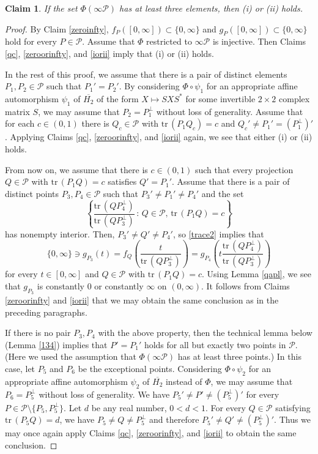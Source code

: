 \documentclass[10pt]{amsart}
\newtheorem{claim}[theorem]{Claim}
\theoremstyle{definition}
\theoremstyle{remark}
\numberwithin{subsection}{section}
\numberwithin{equation}{section}
\newcommand\cP{{\mathcal{P}}}
\newcommand\oH{{\overline{H_2}}}
\begin{document}
\begin{claim}
If the set $\Phi(\infty \cP)$ has at least three elements, then (i) or (ii) holds.
\end{claim}
\begin{proof}
By Claim \ref{zeroinfty}, $f_{P}([0, \infty])\subset \{0, \infty\}$ and $g_{P}([0, \infty])\subset \{0, \infty\}$ hold for every $P\in \cP$.
Assume that $\Phi$ restricted to $\infty \cP$ is injective. 
Then Claims \ref{qc}, \ref{zeroorinfty}, and \ref{iorii} imply that (i) or (ii) holds.

In the rest of this proof, we assume that there is a pair of distinct elements $P_1, P_2\in \cP$ such that $P_1'=P_2'$. 
By considering $\Phi\circ \psi_1$ for an appropriate affine automorphism $\psi_1$ of $\oH$ of the form $X\mapsto SXS^*$ for some invertible $2\times 2$ complex matrix $S$,
we may assume that $P_2=P_1^\perp$ without loss of generality. 
Assume that for each $c\in (0, 1)$ there is $Q_c\in \cP$ with $\mathrm{tr}\,(P_1Q_c)=c$ and $Q_c'\neq P_1'=(P_1^\perp)'$. 
Applying Claims \ref{qc}, 
\ref{zeroorinfty}, and \ref{iorii} again,
we see that either (i) or (ii) holds.

From now on, we assume that there is $c\in (0, 1)$ such that every projection $Q\in \cP$ with $\mathrm{tr}\,(P_1Q)=c$ satisfies $Q'=P_1'$. 
Assume that there is a pair of distinct points $P_3, P_4\in \cP$ such that $P_3'\neq P_1'\neq P_4'$ and the set 
\begin{equation}\label{p3p4}
\left\{ \frac{\mathrm{tr}\, (QP_4^\perp)}{\mathrm{tr}\,(QP_3^\perp)}\,:\, Q\in \cP,\, \mathrm{tr}\,(P_1Q)=c\right\}
\end{equation}
has nonempty interior.  
Then, $P_3'\neq Q'\neq P_4'$, so \eqref{trace2} implies that 
\begin{equation}\label{circle}
\{0, \infty\}\ni g_{P_3}(t)= f_Q\left(\frac{t}{\mathrm{tr}\,(QP_3^\perp)}\right) = g_{P_4}\left(t\frac{\mathrm{tr}\, (QP_4^\perp)}{\mathrm{tr}\,(QP_3^\perp)}\right)
\end{equation}
for every $t\in [0, \infty]$ and $Q\in \cP$ with $\mathrm{tr}\,(P_1Q)=c$. 
Using Lemma \ref{qapl}, we see that $g_{P_3}$ is constantly $0$ or constantly $\infty$ on $(0, \infty)$. 
It follows from Claims \ref{zeroorinfty} and \ref{iorii} that we may obtain the same conclusion as in the preceding paragraphs. 

If there is no pair $P_3, P_4$ with the above property, then the technical lemma below (Lemma \ref{134}) implies that $P'=P_1'$ holds for all but exactly two points in $\cP$. (Here we used the assumption that $\Phi(\infty\cP)$ has at least three points.)
In this case, let $P_5$ and $P_6$ be the exceptional points. 
Considering $\Phi\circ\psi_2$ for an appropriate affine automorphism $\psi_2$ of $\oH$ 
instead of $\Phi$, we may assume that $P_6=P_5^\perp$ without loss of generality.  We have $P_5'\neq P'\neq (P_5^\perp)'$ for every $P\in \cP\setminus\{P_5, P_5^\perp\}$. 
Let $d$ be any real number, $ 0 < d < 1$. For every $Q \in \mathcal{P}$ satisfying $\mathrm{tr}\,(P_5 Q)=d$, we have $P_5\neq Q\neq P_5^\perp$ and therefore $P_5'\neq Q'\neq (P_5^\perp)'$.
 Thus we may once again apply Claims \ref{qc}, \ref{zeroorinfty}, and \ref{iorii} to obtain the same conclusion.
\end{proof}
\end{document}
